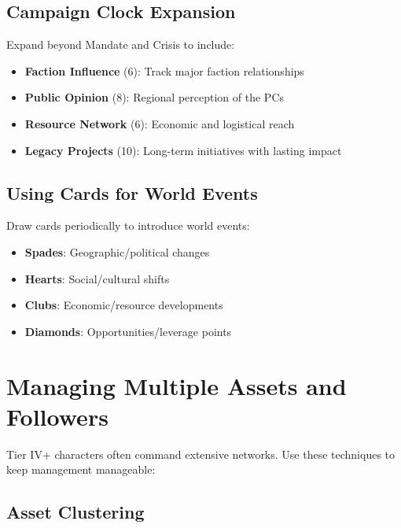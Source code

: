 \subsection*{Campaign Clock Expansion}

Expand beyond Mandate and Crisis to include:

\begin{itemize}
    \item \textbf{Faction Influence} (6): Track major faction relationships
    \item \textbf{Public Opinion} (8): Regional perception of the PCs
    \item \textbf{Resource Network} (6): Economic and logistical reach
    \item \textbf{Legacy Projects} (10): Long-term initiatives with lasting impact
\end{itemize}

\subsection*{Using Cards for World Events}

Draw cards periodically to introduce world events:

\begin{itemize}
    \item \textbf{Spades}: Geographic/political changes
    \item \textbf{Hearts}: Social/cultural shifts
    \item \textbf{Clubs}: Economic/resource developments
    \item \textbf{Diamonds}: Opportunities/leverage points
\end{itemize}

\section{Managing Multiple Assets and Followers}

Tier IV+ characters often command extensive networks. Use these techniques to keep management manageable:

\subsection*{Asset Clustering}

